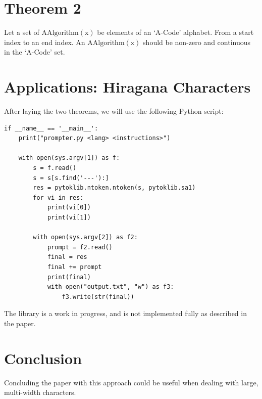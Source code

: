 \documentclass[10pt, twocolumn]{article}
\theoremstyle{plain}
\theoremstyle{definition}
\theoremstyle{remark}
\begin{document}
\section{Theorem 2}
\label{sec:acode-theorem02}

Let a set of $\operatorname{AAlgorithm(x)}$ be elements of an `A-Code' alphabet. From a start index to an end index. An $\operatorname{AAlgorithm(x)}$ should be non-zero and continuous in the `A-Code' set. 

\section{Applications: Hiragana Characters}
\label{sec:acode-conclusion}

After laying the two theorems, we will use the following Python script:

\begin{lstlisting}
if __name__ == '__main__':
    print("prompter.py <lang> <instructions>")
    
    with open(sys.argv[1]) as f: 
        s = f.read()
        s = s[s.find('---'):]
        res = pytoklib.ntoken.ntoken(s, pytoklib.sa1)
        for vi in res:
            print(vi[0])
            print(vi[1])
        
        with open(sys.argv[2]) as f2:
            prompt = f2.read()
            final = res
            final += prompt
            print(final)
            with open("output.txt", "w") as f3:
                f3.write(str(final))
\end{lstlisting}
The library is a work in progress, and is not implemented fully as described in the paper.

\section{Conclusion}
\label{sec:acode-conclusion}

Concluding the paper with this approach could be useful when dealing with large, multi-width characters.
\end{document}
